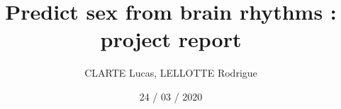\documentclass{article}
\author{CLARTE Lucas, LELLOTTE Rodrigue}
\date{24 / 03 / 2020}
\title{Predict sex from brain rhythms : project report}
\begin{document}
\maketitle


















\nocite{*}



\end{document}
